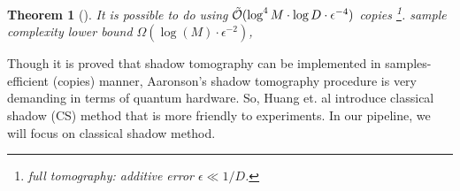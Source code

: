 \documentclass[
reprint,
aps,
pra,
floatfix,
]{revtex4-2}
\theoremstyle{plain}
\newtheorem{theorem}{Theorem}
\theoremstyle{definition}
\newtheorem{remark}{Remark}
\begin{document}
\begin{theorem}[\cite{aaronsonShadowTomographyQuantum2018}]\label{thm:shadow_tomography}
	It is possible to do  using $\tilde{\mathcal{O}}(\log^4 M\cdot \log D\cdot\epsilon^{-4})$ copies
	\footnote{full tomography: additive error $\epsilon\ll 1/D$.}.
	sample complexity lower bound $\Omega(\log (M) \cdot \epsilon^{-2})$, 
\end{theorem}
Though it is proved that shadow tomography can be implemented in samples-efficient (copies) manner,
Aaronson's shadow tomography procedure is very demanding in terms of quantum hardware.
So, Huang et. al \cite{huangPredictingManyProperties2020} introduce classical shadow (CS) method that is more friendly to experiments.
In our pipeline, we will focus on classical shadow method.
\end{document}
